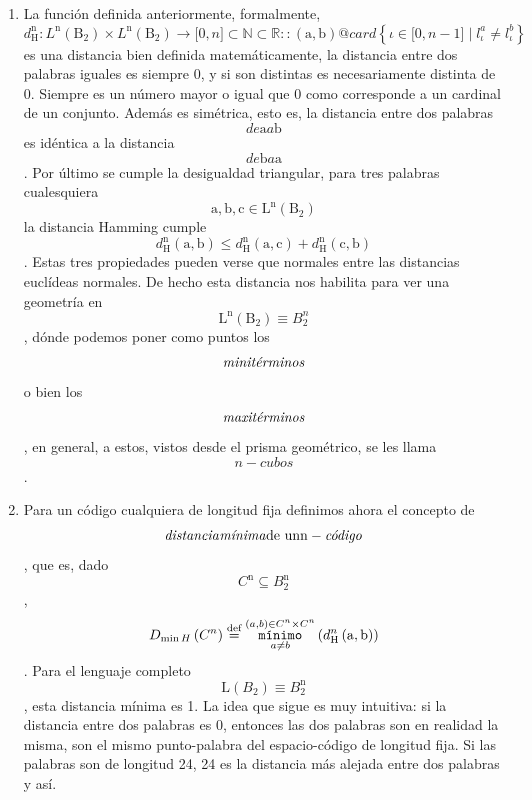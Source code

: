 \begin{enumerate}
\begin{enumerate}
\begin{enumerate}
      En palabras es el número de bits que son diferentes entre amabas
      palabras (posición por posición).
    \item
      La función definida anteriormente, formalmente,
      \[d_{\mathtt{\mathrm{H}}}^{\mathtt{\mathrm{n}}}:L^{\mathtt{\mathrm{n}}}{\left( \mathtt{\mathrm{B_{2}}} \right) \times L^{\mathtt{\mathrm{n}}}}{{{\left( \mathtt{\mathrm{B_{2}}} \right)\rightarrow{\lbrack{0,n}\rbrack}} \subset \mathbb{N}} \subset \mathbb{R}}::\left( \mathtt{\mathrm{a,b}} \right)@\mathit{card}\left\{ {{\iota \in {\lbrack{0,{n - 1}}\rbrack}} \mid {l_{\iota}^{a} \neq l_{\iota}^{b}}} \right\}\]es
      una distancia bien definida matemáticamente, la distancia entre
      dos palabras iguales es siempre 0, y si son distintas es
      necesariamente distinta de 0. Siempre es un número mayor o igual
      que 0 como corresponde a un cardinal de un conjunto. Además es
      si\-métrica, esto es, la distancia entre dos palabras
      \[\mathit{de}\mathtt{\mathrm{a}}a\mathtt{\mathrm{b}}\] es idéntica
      a la distancia
      \[\mathit{de}\mathtt{\mathrm{b}}a\mathtt{\mathrm{a}}\]. Por último
      se cumple la desigualdad triangular, para tres palabras
      cuales\-quiera
      \[{\mathtt{\mathrm{a,b,c}} \in \mathtt{\mathrm{L^{n}}}}\left( \mathtt{\mathrm{B_{2}}} \right)\]
      la distancia Hamming cumple
      \[d_{\mathtt{\mathrm{H}}}^{\mathtt{\mathrm{n}}}{\left( \mathtt{\mathrm{a,b}} \right) \leq {d_{\mathtt{\mathrm{H}}}^{\mathtt{\mathrm{n}}}{\left( \mathtt{\mathrm{a,c}} \right) + d_{\mathtt{\mathrm{H}}}^{\mathtt{\mathrm{n}}}}\left( \mathtt{\mathrm{c,b}} \right)}}\].
      Estas tres propiedades pueden verse que normales entre las
      distancias euclídeas normales. De hecho esta distancia nos
      habilita para ver una geometría
      en\[\mathtt{\mathrm{L^{n}}}{\left( \mathtt{\mathrm{B_{2}}} \right) \equiv B_{2}^{n}}\],
      dónde podemos poner como puntos los \[\text{\textit{minitérminos}}\]o
      bien los \[\text{\textit{maxitérminos}}\], en general, a estos, vistos
      desde el pris\-ma geométrico, se les llama \[n - \mathit{cubos}\].
    \item
      Para un código cualquiera de longitud fija definimos ahora el
      concepto de
      \[\mathit{distancia}\text{\textit{mínima}}\text{de un}{\mathtt{\mathrm{n}} - \text{\textit{código}}}\],
      que es, dado
      \[C^{\mathtt{\mathrm{n}}} \subseteq B_{2}^{\mathtt{\mathrm{n}}}\],
      \[D_{\min H}\left( C^{n} \right)\overset{\text{def}}{=}\underset{a \neq b}{\overset{{({a,b})} \in {C^{n} \times C^{n}}}{\text{\texttt{mínimo}}}}\left( {d_{\mathtt{\mathrm{H}}}^{n}\left( \mathtt{\mathrm{a,b}} \right)} \right)\].
      Para el lenguaje completo
      \[\mathtt{\mathrm{L}}{\left( B_{2} \right) \equiv B_{2}^{\mathtt{\mathrm{n}}}}\],
      esta distancia mínima es 1. La idea que sigue es muy intuitiva: si
      la distancia entre dos palabras es 0, entonces las dos palabras
      son en realidad la misma, son el mismo pun\-to-palabra del
      espacio-código de longitud fija. Si las palabras son de longitud
      24, 24 es la distancia más alejada entre dos palabras y así.


\end{enumerate}
\end{enumerate}
\end{enumerate}
